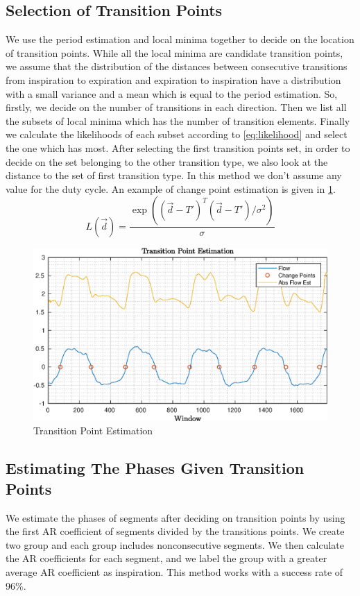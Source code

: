 \subsection{Selection of Transition Points}
We use the period estimation and local minima together to decide on the location of transition points. While all the local minima are candidate transition points, we assume that the distribution of the distances between consecutive transitions from inspiration to expiration and expiration to inspiration have a distribution with a small variance and a mean which is equal to the period estimation. So, firstly, we decide on the number of transitions in each direction. Then we list all the subsets of local minima which has the number of transition elements. Finally we calculate the likelihoods of each subset according to \eqref{eq:likelihood} and select the one which has most. After selecting the first transition points set, in order to decide on the set belonging to the other transition type, we also look at the distance to the set of first transition type. In this method we don't assume any value for the duty cycle. An example of change point estimation is given in \ref{fig:transition}.
\begin{equation}
	L(\vec{d}) = \frac{\exp((\vec{d}-T')^T(\vec{d}-T')/\sigma^2)}{\sigma}
	\label{eq:likelihood} 
\end{equation}
\begin{figure}[h!]
	\begin{center}
		\includegraphics[width=\textwidth]{figures/transition.eps}
		\caption{Transition Point Estimation}
		\label{fig:transition}
	\end{center}
\end{figure}
\subsection{Estimating The Phases Given Transition Points}
We estimate the phases of segments after deciding on transition points by using the first AR coefficient of segments divided by the transitions points. We create two group and each group includes nonconsecutive segments. We then calculate the AR coefficients for each segment, and we label the group with a greater average AR coefficient as inspiration. This method works with a success rate of 96\%.